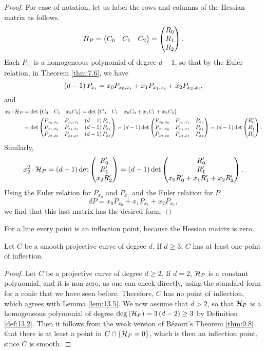 \begin{proof}
For ease of notation, let us label the rows and columns of the Hessian matrix as follows.
$$ H_P = \begin{pmatrix} C_0 & C_1 & C_2 \end{pmatrix} = \begin{pmatrix} R_0 \\ R_1 \\ R_2 \end{pmatrix}.
$$
Each $ P_{x_i} $ is a homogeneous polynomial of degree $ d - 1 $, so that by the Euler relation, in Theorem \ref{thm:7.6}, we have
$$ \br{d - 1}P_{x_i} = x_0P_{x_0, x_i} + x_1P_{x_1, x_i} + x_2P_{x_2, x_i}, $$
and
\begin{align*}
x_2 \cdot \HH_P
& = \det\onebythree{C_0}{C_1}{x_2C_2}
= \det\onebythree{C_0}{C_1}{x_0C_0 + x_1C_1 + x_2C_2} \\
& = \det\threebythree{P_{x_0, x_0}}{P_{x_0, x_1}}{\br{d - 1}P_{x_0}}{P_{x_1, x_0}}{P_{x_1, x_1}}{\br{d - 1}P_{x_1}}{P_{x_2, x_0}}{P_{x_2, x_1}}{\br{d - 1}P_{x_2}}
= \br{d - 1}\det\threebythree{P_{x_0, x_0}}{P_{x_0, x_1}}{P_{x_0}}{P_{x_1, x_0}}{P_{x_1, x_1}}{P_{x_1}}{P_{x_2, x_0}}{P_{x_2, x_1}}{P_{x_2}}
= \br{d - 1}\det\threebyone{R_0'}{R_1'}{R_2'}.
\end{align*}
Similarly,
$$ x_2^2 \cdot \HH_P = \br{d - 1}\det\threebyone{R_0'}{R_1'}{x_2R_2'} = \br{d - 1}\det\threebyone{R_0'}{R_1'}{x_0R_0' + x_1R_1' + x_2R_2'}. $$
Using the Euler relation for $ P_{x_0} $ and $ P_{x_1} $ and the Euler relation for $ P $
$$ dP = x_0P_{x_0} + x_1P_{x_1} + x_2P_{x_2}, $$
we find that this last matrix has the desired form.
\end{proof}

\begin{note*}
For a line every point is an inflection point, because the Hessian matrix is zero.
\end{note*}

\begin{lemma}
\label{lem:13.5}
Let $ C $ be a smooth projective curve of degree $ d $. If $ d \ge 3 $, $ C $ has at least one point of inflection.
\end{lemma}

\begin{proof}
Let $ C $ be a projective curve of degree $ d \ge 2 $. If $ d = 2 $, $ \mathcal{H}_P $ is a constant polynomial, and it is non-zero, as one can check directly, using the standard form for a conic that we have seen before. Therefore, $ C $ has no point of inflection, which agrees with Lemma \ref{lem:13.5}. We now assume that $ d > 2 $, so that $ \mathcal{H}_P $ is a homogeneous polynomial of degree $ \deg\br{\HH_P} = 3\br{d - 2} \ge 3 $ by Definition \ref{def:13.2}. Then it follows from the weak version of B\'ezout's Theorem \ref{thm:9.8} that there is at least a point in $ C \cap \cbr{\HH_P = 0} $, which is then an inflection point, since $ C $ is smooth.
\end{proof}

